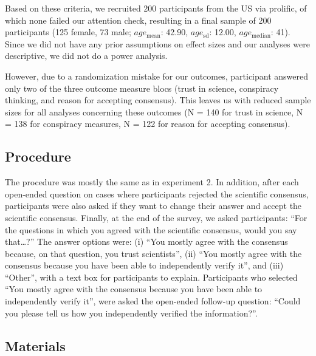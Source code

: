 \documentclass[
  doc,floatsintext]{apa6}
\begin{document}
Based on these criteria, we recruited 200 participants from the US via prolific, of which none failed our attention check, resulting in a final sample of 200 participants (125 female, 73 male; \(age_\text{mean}\): 42.90, \(age_\text{sd}\): 12.00, \(age_\text{median}\): 41). Since we did not have any prior assumptions on effect sizes and our analyses were descriptive, we did not do a power analysis.

However, due to a randomization mistake for our outcomes, participant answered only two of the three outcome measure blocs (trust in science, conspiracy thinking, and reason for accepting consensus). This leaves us with reduced sample sizes for all analyses concerning these outcomes (N = 140 for trust in science, N = 138 for conspiracy measures, N = 122 for reason for accepting consensus).

\subsection{Procedure}\label{procedure-2}

The procedure was mostly the same as in experiment 2. In addition, after each open-ended question on cases where participants rejected the scientific consensus, participants were also asked if they want to change their answer and accept the scientific consensus. Finally, at the end of the survey, we asked participants: ``For the questions in which you agreed with the scientific consensus, would you say that\ldots?'' The answer options were: (i) ``You mostly agree with the consensus because, on that question, you trust scientists'', (ii) ``You mostly agree with the consensus because you have been able to independently verify it'', and (iii) ``Other'', with a text box for participants to explain. Participants who selected ``You mostly agree with the consensus because you have been able to independently verify it'', were asked the open-ended follow-up question: ``Could you please tell us how you independently verified the information?''.

\subsection{Materials}\label{materials-4}

\FloatBarrier
\end{document}
